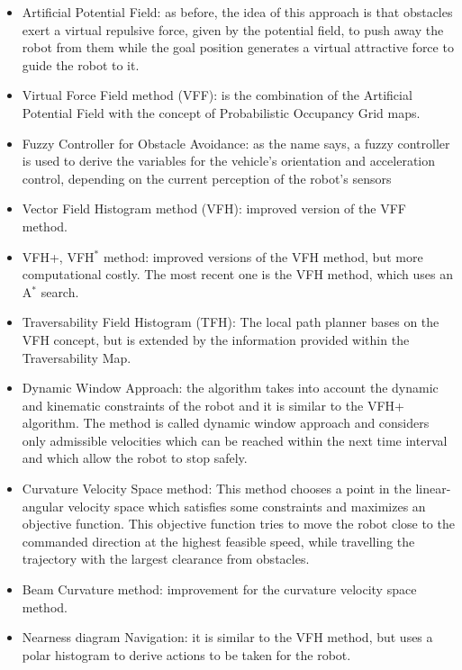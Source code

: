 \begin{itemize}
  \item Artificial Potential Field: as before, the idea of this approach is that
  obstacles exert a virtual repulsive force, given by the potential field, to push
  away the robot from them while the goal position generates a virtual attractive
  force to guide the robot to it.

  \item Virtual Force Field method (VFF): is the combination of the Artificial Potential
  Field with the concept of Probabilistic Occupancy Grid maps.

  \item Fuzzy Controller for Obstacle Avoidance: as the name says, a fuzzy controller
  is used to derive the variables for the vehicle’s orientation and acceleration control,
  depending on the current perception of the robot’s sensors

  \item Vector Field Histogram method (VFH): improved version of the VFF method.

  \item VFH+, VFH$^*$ method: improved versions of the VFH method, but more computational costly.
  The most recent one is the VFH method, which uses an A$^*$ search.

  \item Traversability Field Histogram (TFH): The local path planner bases on
  the VFH concept, but is extended by the information provided within the Traversability Map.

  \item Dynamic Window Approach: the algorithm takes into account the dynamic and kinematic constraints
  of the robot and it is similar to the VFH+ algorithm. The method is called
  dynamic window approach and considers only admissible velocities which can be
  reached within the next time interval and which allow the robot to stop safely.

  \item Curvature Velocity Space method: This method chooses a point in the linear-angular
  velocity space which satisfies some constraints and maximizes an objective function.
  This objective function tries to move the robot close to the commanded direction at
  the highest feasible speed, while travelling the trajectory with the largest clearance from obstacles.

  \item Beam Curvature method: improvement for the curvature velocity space method.

  \item Nearness diagram Navigation: it is similar to the VFH method, but uses
  a polar histogram to derive actions to be taken for the robot.
\end{itemize}

